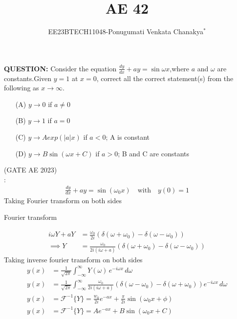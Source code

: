 \documentclass[journal,12pt,onecolumn]{IEEEtran}
\theoremstyle{remark}
\begin{document}
 
 \vspace{3cm}
 \title{\textbf{AE 42}}
 \author{EE23BTECH11048-Ponugumati Venkata Chanakya$^{*}$%
 }
 \maketitle
 \bigskip
 \renewcommand{\thefigure}{\theenumi}
 \renewcommand{\thetable}{\theenumi}
 \textbf{QUESTION:}
Consider the equation $\frac{dy}{dx}+ay=\sin{\omega x}$,where $a$ and $\omega$ are constants.Given $y=1$ at $x=0$, correct all the correct statement(s) from the following as $x\to \infty$.
\begin{enumerate}

  \item[(A)]  $y \to 0$ if $a \neq 0$ \\ 
  \item[(B)]  $y \to 1$ if $a = 0$\\
  \item[(C)]  $y \to Aexp(|a|x)$ if $a < 0$; A is constant\\
  \item[(D)]  $y \to B \sin(\omega x+C)$ if $a>0$; B and C are constants\\
\end{enumerate}
\hfill(GATE AE 2023)\\
\solution: \\
\begin{align}
\frac{dy}{dx} + ay = \sin(\omega_0 x) \quad \text{with} \quad y(0) = 1
\end{align}
 Taking Fourier transform on both sides 
  \begin{table}[!ht]
    \centering
        
    \caption{Fourier transform}
    \label{tab:Gate AE 42 }
\end{table}
\begin{align}
 i\omega Y + aY &= \frac{\omega_0}{2i} \left( \delta(\omega + \omega_0) - \delta(\omega - \omega_0) \right)\\
    \implies Y &= \frac{\omega_0}{2i(i\omega + a)} \left( \delta(\omega + \omega_0) - \delta(\omega - \omega_0) \right)
 \end{align}
 Taking inverse fourier transform on both sides 
 \begin{align}
 y(x) &= \frac{1}{\sqrt{2\pi}} \int_{-\infty}^{\infty} Y(\omega) \, e^{-i\omega x} \, d\omega\\
   y(x) &= \frac{1}{\sqrt{2\pi}} \int_{-\infty}^{\infty} \frac{\omega_0}{2i(i\omega + a)} \left( \delta(\omega - \omega_0) - \delta(\omega + \omega_0) \right) e^{-i\omega x} \, d\omega\\
   y(x) &= \mathcal{F}^{-1}\{Y\} = \frac{w_0}{2i} e^{-ax} + \frac{\pi}{2i}\sin(\omega_0 x+\phi)\\
y(x) &= \mathcal{F}^{-1}\{Y\} = A e^{-ax} + B\sin(\omega_0 x+C)
 \end{align}
\end{document}
